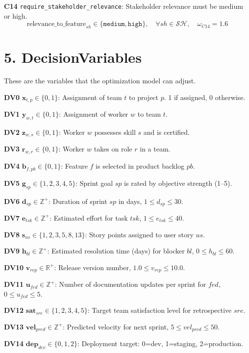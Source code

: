 \documentclass[12pt]{article}
\begin{document}
    \item[\textbf{C14}] \texttt{require\_stakeholder\_relevance}: Stakeholder relevance must be medium or high.
    \[
    \text{relevance\_to\_feature}_{sh} \in \{\texttt{medium}, \texttt{high}\}, \quad \forall sh \in \mathcal{SH}, \quad \omega_{C14} = 1.6
    \]

\section{5. DecisionVariables}
These are the variables that the optimization model can adjust.

\item[\textbf{DV0}] $\mathbf{x}_{t,p} \in \{0,1\}$: Assignment of team $t$ to project $p$. 1 if assigned, 0 otherwise.
    \item[\textbf{DV1}] $\mathbf{y}_{w,t} \in \{0,1\}$: Assignment of worker $w$ to team $t$.
    \item[\textbf{DV2}] $\mathbf{z}_{w,s} \in \{0,1\}$: Worker $w$ possesses skill $s$ and is certified.
    \item[\textbf{DV3}] $\mathbf{r}_{w,r} \in \{0,1\}$: Worker $w$ takes on role $r$ in a team.
    \item[\textbf{DV4}] $\mathbf{b}_{f,pb} \in \{0,1\}$: Feature $f$ is selected in product backlog $pb$.
    \item[\textbf{DV5}] $\mathbf{g}_{sp} \in \{1,2,3,4,5\}$: Sprint goal $sp$ is rated by objective strength (1–5).
    \item[\textbf{DV6}] $\mathbf{d}_{sp} \in \mathbb{Z}^+$: Duration of sprint $sp$ in days, $1 \leq d_{sp} \leq 30$.
    \item[\textbf{DV7}] $\mathbf{e}_{tsk} \in \mathbb{Z}^+$: Estimated effort for task $tsk$, $1 \leq e_{tsk} \leq 40$.
    \item[\textbf{DV8}] $\mathbf{s}_{us} \in \{1,2,3,5,8,13\}$: Story points assigned to user story $us$.
    \item[\textbf{DV9}] $\mathbf{h}_{bl} \in \mathbb{Z}^+$: Estimated resolution time (days) for blocker $bl$, $0 \leq h_{bl} \leq 60$.
    \item[\textbf{DV10}] $\mathbf{v}_{rep} \in \mathbb{R}^+$: Release version number, $1.0 \leq v_{rep} \leq 10.0$.
    \item[\textbf{DV11}] $\mathbf{u}_{fed} \in \mathbb{Z}^+$: Number of documentation updates per sprint for $fed$, $0 \leq u_{fed} \leq 5$.
    \item[\textbf{DV12}] $\mathbf{sat}_{sre} \in \{1,2,3,4,5\}$: Target team satisfaction level for retrospective $sre$.
    \item[\textbf{DV13}] $\mathbf{vel}_{pred} \in \mathbb{Z}^+$: Predicted velocity for next sprint, $5 \leq vel_{pred} \leq 50$.
    \item[\textbf{DV14}] $\mathbf{dep}_{dev} \in \{0,1,2\}$: Deployment target: 0=dev, 1=staging, 2=production.
\end{document}
